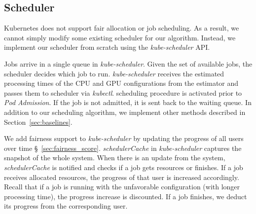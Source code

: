 \subsection{Scheduler}
Kubernetes does not support fair allocation or job scheduling. As a result, we cannot simply modify some existing scheduler for our algorithm. 
Instead, we implement our scheduler from scratch using the \textit{kube-scheduler} API.




Jobs arrive in a single queue in \textit{kube-scheduler}.
Given the set of available jobs, the scheduler decides which job to run. 
\textit{kube-scheduler} receives the estimated processing times of the CPU and GPU configurations from the estimator and passes them to \name scheduler via \textit{kubectl}. 
\name scheduling procedure is activated prior to \textit{Pod Admission}.
If the job is not admitted, it is sent back to the waiting queue.
In addition to our scheduling algorithm, we implement other methods described in Section~\ref{sec:baselines}.

We add fairness support to \textit{kube-scheduler} by updating the progress of all users over time \S~\ref{sec:fairness_score}.
\textit{schedulerCache} in \textit{kube-scheduler} captures the snapshot of the whole system.
When there is an update from the system, \textit{schedulerCache} is notified and \name checks if a job gets resources or finishes.
If a job receives allocated resources, the progress of that user is increased accordingly.
Recall that if a job is running with the unfavorable configuration (with longer processing time), the progress increase is discounted.%
If a job finishes, we deduct its progress from the corresponding user.

